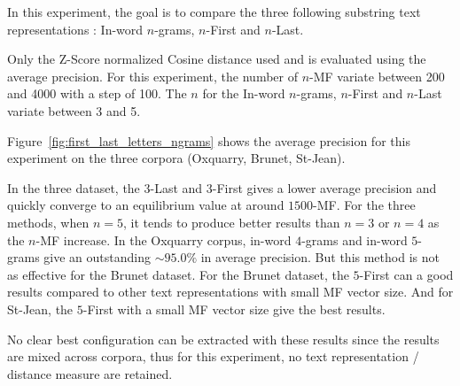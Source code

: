 In this experiment, the goal is to compare the three following substring text representations : In-word $n$-grams, $n$-First and $n$-Last.

Only the Z-Score normalized Cosine distance used and is evaluated using the average precision.
For this experiment, the number of $n$-MF variate between 200 and 4000 with a step of 100.
The $n$ for the In-word $n$-grams, $n$-First and $n$-Last variate between 3 and 5.

Figure~\ref{fig:first_last_letters_ngrams} shows the average precision for this experiment on the three corpora (Oxquarry, Brunet, St-Jean).

In the three dataset, the $3$-Last and $3$-First gives a lower average precision and quickly converge to an equilibrium value at around $1500$-MF.
For the three methods, when $n = 5$, it tends to produce better results than $n = 3$ or $n = 4$ as the $n$-MF increase.
In the Oxquarry corpus, in-word $4$-grams and in-word $5$-grams give an outstanding $\sim 95.0\%$ in average precision.
But this method is not as effective for the Brunet dataset.
For the Brunet dataset, the $5$-First can a good results compared to other text representations with small MF vector size.
And for St-Jean, the $5$-First with a small MF vector size give the best results.

No clear best configuration can be extracted with these results since the results are mixed across corpora, thus for this experiment, no text representation / distance measure are retained.

